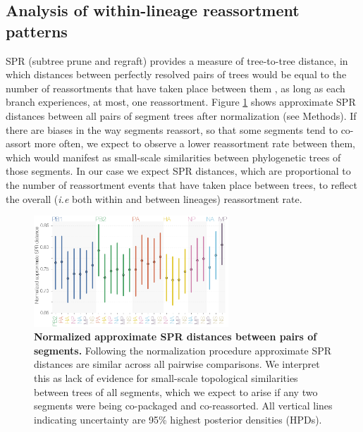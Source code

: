 \documentclass[11pt,oneside,letterpaper]{article}
\begin{document}
\subsection*{Analysis of within-lineage reassortment patterns}
SPR (subtree prune and regraft) provides a measure of tree-to-tree distance, in which distances between perfectly resolved pairs of trees would be equal to the number of reassortments that have taken place between them \citep{svinti2013}, as long as each branch experiences, at most, one reassortment.
Figure \ref{SPRdistances} shows approximate SPR distances between all pairs of segment trees after normalization (see Methods).
If there are biases in the way segments reassort, so that some segments tend to co-assort more often, we expect to observe a lower reassortment rate between them, which would manifest as small-scale similarities between phylogenetic trees of those segments.
In our case we expect SPR distances, which are proportional to the number of reassortment events that have taken place between trees, to reflect the overall (\textit{i.e} both within and between lineages) reassortment rate.

\begin{figure}[h]
	\centering		
	\includegraphics[width=0.65\textwidth]{figures/InfB_normalizedApproxSPR.png}
	\caption{\textbf{Normalized approximate SPR distances between pairs of segments.}
Following the normalization procedure approximate SPR distances are similar across all pairwise comparisons.
We interpret this as lack of evidence for small-scale topological similarities between trees of all segments, which we expect to arise if any two segments were being co-packaged and co-reassorted.
All vertical lines indicating uncertainty are 95\% highest posterior densities (HPDs).}
	\label{SPRdistances}
\end{figure}
\end{document}
